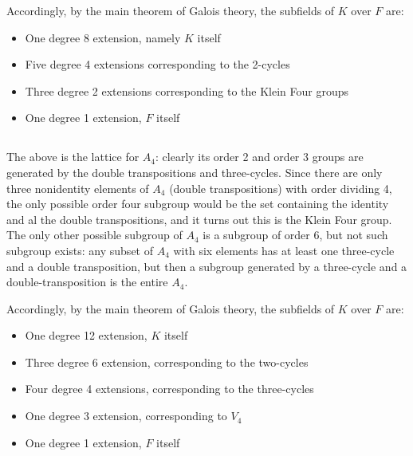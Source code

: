 \documentclass[12pt]{article}
\begin{document}
Accordingly, by the main theorem of Galois theory, the subfields of $K$ over $F$ are: 
\begin{itemize}
  \item One degree 8 extension, namely $K$ itself
  \item Five degree 4 extensions corresponding to the 2-cycles
  \item Three degree 2 extensions corresponding to the Klein Four groups 
  \item One degree 1 extension, $F$ itself
\end{itemize}

\subsection{} 
\begin{center}
\end{center}
The above is the lattice for $A_4$: 
clearly its order 2 and order 3 groups are generated by the double transpositions and three-cycles. 
Since there are only three nonidentity elements of $A_4$ (double transpositions) with order dividing 4, the only possible order four subgroup would be the set containing the identity and al the double transpositions, and it turns out this is the Klein Four group. 
The only other possible subgroup of $A_4$ is a subgroup of order 6, but not such subgroup exists: any subset of $A_4$ with six elements has at least one three-cycle and a double transposition, but then a subgroup generated by a three-cycle and a double-transposition is the entire $A_4$. 

Accordingly, by the main theorem of Galois theory, the subfields of $K$ over $F$ are: 
\begin{itemize}
  \item One degree 12 extension, $K$ itself
  \item Three degree 6 extension, corresponding to the two-cycles
  \item Four degree 4 extensions, corresponding to the three-cycles
  \item One degree 3 extension, corresponding to $V_4$
  \item One degree 1 extension, $F$ itself 
\end{itemize}
\end{document}

